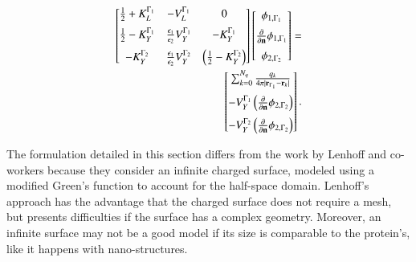  \begin{align} \label{eq:matrix_dphi}
 \left[
    \begin{matrix} %
       \frac{1}{2} + K_{L}^{\Gamma_1} & -V_{L}^{\Gamma_1} & 0 \vspace{0.2cm}\\
       \frac{1}{2} - K_{Y}^{\Gamma_1} &  \frac{\epsilon_1}{\epsilon_2} V_{Y}^{\Gamma_1} & -K_{Y}^{\Gamma_1} \vspace{0.2cm} \\
       - K_{Y}^{\Gamma_2} & \frac{\epsilon_1}{\epsilon_2} V_{Y}^{\Gamma_2} & \left(\frac{1}{2} - K_{Y}^{\Gamma_2}\right) \\
    \end{matrix}
    \right] \left[ 
    \begin{matrix} %
       \phi_{1,\Gamma_1} \vspace{0.2cm} \\
       \frac{\partial}{\partial \mathbf{n}} \phi_{1,\Gamma_1} \vspace{0.2cm}\\
       \phi_{2,\Gamma_2}\\
    \end{matrix} 
     \right] =   \nonumber \\
    \left[
    \begin{matrix} %
       \sum_{k=0}^{N_q} \frac{q_k}{4\pi|\mathbf{r}_{\Gamma_1} - \mathbf{r}_k|} \vspace{0.2cm} \\
        -V_{Y}^{\Gamma_1} \left( \frac{\partial}{\partial \mathbf{n}} \phi_{2,\Gamma_2} \right) \vspace{0.2cm} \\
        -V_{Y}^{\Gamma_2} \left( \frac{\partial}{\partial \mathbf{n}} \phi_{2,\Gamma_2} \right)
    \end{matrix}
    \right].
 \end{align}
 

The formulation detailed in this section differs from the work by Lenhoff and co-workers\cite{YoonLenhoff1992,RothLenhoff1993} because they consider an infinite charged surface, modeled using a modified Green's function to account for the half-space domain. Lenhoff's approach has the advantage that the charged surface does not require a mesh, but presents difficulties if the surface has a complex geometry. Moreover, an infinite surface may not be a good model if its size is comparable to the protein's, like it happens with nano-structures.

